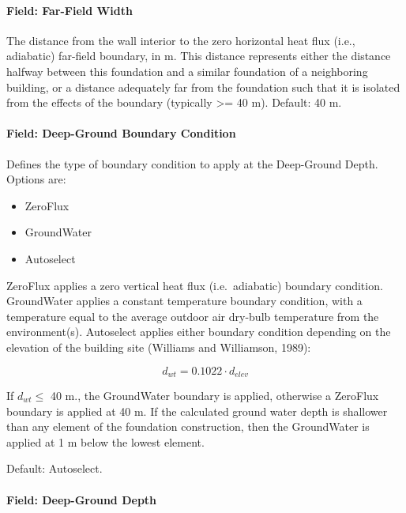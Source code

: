 \paragraph{Field: Far-Field Width}\label{foundation-kiva-settings-far-field-width}

The distance from the wall interior to the zero horizontal heat flux
(i.e., adiabatic) far-field boundary, in m. This distance represents
either the distance halfway between this foundation and a similar
foundation of a neighboring building, or a distance adequately far from
the foundation such that it is isolated from the effects of the boundary
(typically \textgreater{}= 40 m). Default: 40 m.

\paragraph{Field: Deep-Ground Boundary Condition}\label{foundation-kiva-settings-deep-ground-boundary-condition}

Defines the type of boundary condition to apply at the Deep-Ground
Depth. Options are:

\begin{itemize}
\tightlist
\item
  ZeroFlux
\item
  GroundWater
\item
  Autoselect
\end{itemize}

ZeroFlux applies a zero vertical heat flux (i.e.~adiabatic) boundary
condition. GroundWater applies a constant temperature boundary
condition, with a temperature equal to the average outdoor air dry-bulb
temperature from the environment(s). Autoselect applies either boundary
condition depending on the elevation of the building site (Williams and
Williamson, 1989):

\[d_{wt}=0.1022\cdot d_{elev}\]

If \(d_{wt} \le\) 40 m., the GroundWater boundary is applied, otherwise
a ZeroFlux boundary is applied at 40 m. If the calculated ground water depth is
shallower than any element of the foundation construction, then the GroundWater
is applied at 1 m below the lowest element.

Default: Autoselect.

\paragraph{Field: Deep-Ground Depth}\label{foundation-kiva-settings-deep-ground-depth}

